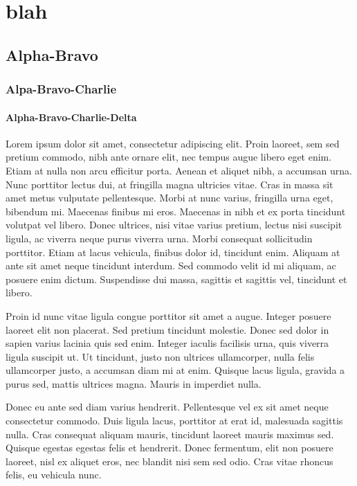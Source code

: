 \documentclass[a4paper, 11pt]{report}
\begin{document}
\uselargefont

\makedocumenttitlepage


\tableofcontents

\chapter{blah}

\section{Alpha-Bravo}
\subsection{Alpa-Bravo-Charlie}
\subsubsection{Alpha-Bravo-Charlie-Delta}

Lorem ipsum dolor sit amet, consectetur adipiscing elit. Proin laoreet, sem sed pretium commodo, nibh ante ornare elit, nec tempus augue libero eget enim. Etiam at nulla non arcu efficitur porta. Aenean et aliquet nibh, a accumsan urna. Nunc porttitor lectus dui, at fringilla magna ultricies vitae. Cras in massa sit amet metus vulputate pellentesque. Morbi at nunc varius, fringilla urna eget, bibendum mi. Maecenas finibus mi eros. Maecenas in nibh et ex porta tincidunt volutpat vel libero. Donec ultrices, nisi vitae varius pretium, lectus nisi suscipit ligula, ac viverra neque purus viverra urna. Morbi consequat sollicitudin porttitor. Etiam at lacus vehicula, finibus dolor id, tincidunt enim. Aliquam at ante sit amet neque tincidunt interdum. Sed commodo velit id mi aliquam, ac posuere enim dictum. Suspendisse dui massa, sagittis et sagittis vel, tincidunt et libero.

Proin id nunc vitae ligula congue porttitor sit amet a augue. Integer posuere laoreet elit non placerat. Sed pretium tincidunt molestie. Donec sed dolor in sapien varius lacinia quis sed enim. Integer iaculis facilisis urna, quis viverra ligula suscipit ut. Ut tincidunt, justo non ultrices ullamcorper, nulla felis ullamcorper justo, a accumsan diam mi at enim. Quisque lacus ligula, gravida a purus sed, mattis ultrices magna. Mauris in imperdiet nulla.

Donec eu ante sed diam varius hendrerit. Pellentesque vel ex sit amet neque consectetur commodo. Duis ligula lacus, porttitor at erat id, malesuada sagittis nulla. Cras consequat aliquam mauris, tincidunt laoreet mauris maximus sed. Quisque egestas egestas felis et hendrerit. Donec fermentum, elit non posuere laoreet, nisl ex aliquet eros, nec blandit nisi sem sed odio. Cras vitae rhoncus felis, eu vehicula nunc.
\end{document}
